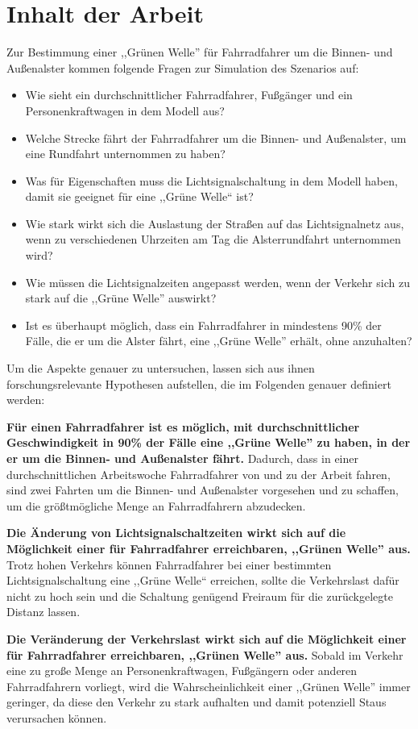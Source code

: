 %
%
\section{Inhalt der Arbeit}\label{sec:theses}

Zur Bestimmung einer ,,Grünen Welle'' für Fahrradfahrer um die Binnen- und Außenalster kommen folgende Fragen zur Simulation des Szenarios auf:

\begin{itemize}
    \item Wie sieht ein durchschnittlicher Fahrradfahrer, Fußgänger und ein Personenkraftwagen in dem Modell aus?
    \item Welche Strecke fährt der Fahrradfahrer um die Binnen- und Außenalster, um eine Rundfahrt unternommen zu haben?
    \item Was für Eigenschaften muss die Lichtsignalschaltung in dem Modell haben, damit sie geeignet für eine ,,Grüne Welle`` ist?
    \item Wie stark wirkt sich die Auslastung der Straßen auf das Lichtsignalnetz aus, wenn zu verschiedenen Uhrzeiten am Tag die Alsterrundfahrt unternommen wird?
    \item Wie müssen die Lichtsignalzeiten angepasst werden, wenn der Verkehr sich zu stark auf die ,,Grüne Welle'' auswirkt?
    \item Ist es überhaupt möglich, dass ein Fahrradfahrer in mindestens 90\% der Fälle, die er um die Alster fährt, eine ,,Grüne Welle'' erhält, ohne anzuhalten?
\end{itemize}

Um die Aspekte genauer zu untersuchen, lassen sich aus ihnen forschungsrelevante Hypothesen aufstellen, die im Folgenden genauer definiert werden:

\textbf{Für einen Fahrradfahrer ist es möglich, mit durchschnittlicher Geschwindigkeit in 90\% der Fälle eine ,,Grüne Welle'' zu haben, in der er um die Binnen- und Außenalster fährt.}
Dadurch, dass in einer durchschnittlichen Arbeitswoche Fahrradfahrer von und zu der Arbeit fahren, sind zwei Fahrten um die Binnen- und Außenalster vorgesehen und zu schaffen, um die größtmögliche Menge an Fahrradfahrern abzudecken.

\textbf{Die Änderung von Lichtsignalschaltzeiten wirkt sich auf die Möglichkeit einer für Fahrradfahrer erreichbaren, ,,Grünen Welle'' aus.}
Trotz hohen Verkehrs können Fahrradfahrer bei einer bestimmten Lichtsignalschaltung eine ,,Grüne Welle`` erreichen, sollte die Verkehrslast dafür nicht zu hoch sein und die Schaltung genügend Freiraum für die zurückgelegte Distanz lassen.

\textbf{Die Veränderung der Verkehrslast wirkt sich auf die Möglichkeit einer für Fahrradfahrer erreichbaren, ,,Grünen Welle'' aus.}
Sobald im Verkehr eine zu große Menge an Personenkraftwagen, Fußgängern oder anderen Fahrradfahrern vorliegt, wird die Wahrscheinlichkeit einer ,,Grünen Welle'' immer geringer, da diese den Verkehr zu stark aufhalten und damit potenziell Staus verursachen können.
